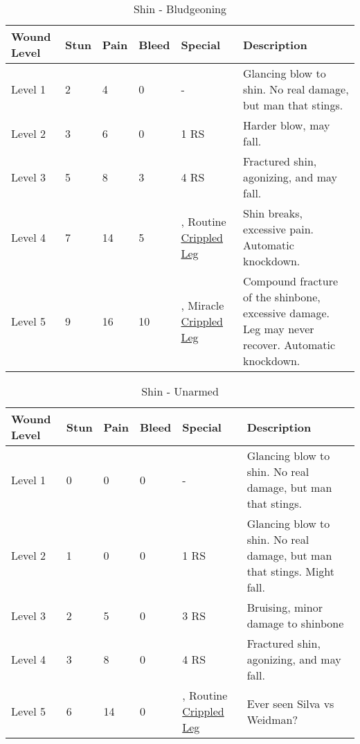 \documentclass[oneside,11pt,english]{book}
\begin{document}
\begin{table}[hb] %
	\caption{Shin - Bludgeoning}
	\label{wound:Shin - Bludgeoning}
	\begin{tabu} to 
Wound Level &Stun &Pain &Bleed &Special &Description\\\toprule
Level 1& 2& 4& 0& - &Glancing blow to shin. No real damage, but man that stings.\\
Level 2& 3& 6& 0&  1 RS &Harder blow, may fall.\\
Level 3& 5& 8& 3&  4 RS &Fractured shin, agonizing, and may fall.\\
Level 4& 7& 14& 5& , \newline
	Routine~ \hyperref[bane:Crippled Limb/Appendage]{Crippled Leg} &Shin breaks, excessive pain. Automatic knockdown.\\
Level 5& 9& 16& 10& , \newline
	Miracle~ \hyperref[bane:Crippled Limb/Appendage]{Crippled Leg} &Compound fracture of the shinbone, excessive damage. Leg may never recover. Automatic knockdown.\\
	\end{tabu}
\end{table}

\begin{table}[!hb] %
	\caption{Shin - Unarmed}
	\label{wound:Shin - Unarmed}
	\begin{tabu} to 
Wound Level &Stun &Pain &Bleed &Special &Description\\\toprule
Level 1& 0& 0& 0& - &Glancing blow to shin. No real damage, but man that stings. \\
Level 2& 1& 0& 0&  1 RS &Glancing blow to shin. No real damage, but man that stings. Might fall.\\
Level 3& 2& 5& 0&  3 RS &Bruising, minor damage to shinbone\\
Level 4& 3& 8& 0&  4 RS &Fractured shin, agonizing, and may fall.\\
Level 5& 6& 14& 0& , \newline
	Routine~ \hyperref[bane:Crippled Limb/Appendage]{Crippled Leg} &Ever seen Silva vs Weidman?\\
	\end{tabu}
\end{table}
	\clearpage
\end{document}
